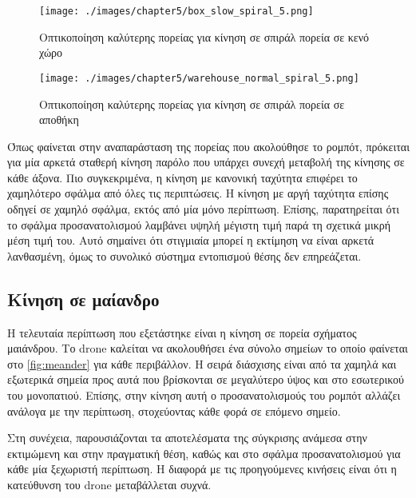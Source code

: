 \begin{figure}[!ht]
    \centering
    \texttt{[image: ./images/chapter5/box\_slow\_spiral\_5.png]}
    \caption{Οπτικοποίηση καλύτερης πορείας για κίνηση σε σπιράλ πορεία σε κενό χώρο}
    \label{fig:path_spiral_slow_corridor}
\end{figure}

\begin{figure}[!ht]
    \centering
    \texttt{[image: ./images/chapter5/warehouse\_normal\_spiral\_5.png]}
    \caption{Οπτικοποίηση καλύτερης πορείας για κίνηση σε σπιράλ πορεία σε αποθήκη}
    \label{fig:path_spiral_normal_warehouse}
\end{figure}

Όπως φαίνεται στην αναπαράσταση της πορείας που ακολούθησε το ρομπότ, πρόκειται για μία αρκετά σταθερή κίνηση παρόλο που υπάρχει συνεχή μεταβολή της κίνησης σε κάθε άξονα. Πιο συγκεκριμένα, η κίνηση με κανονική ταχύτητα επιφέρει το χαμηλότερο σφάλμα από όλες τις περιπτώσεις. Η κίνηση με αργή ταχύτητα επίσης οδηγεί σε χαμηλό σφάλμα, εκτός από μία μόνο περίπτωση. Επίσης, παρατηρείται ότι το σφάλμα προσανατολισμού λαμβάνει υψηλή μέγιστη τιμή παρά τη σχετικά μικρή μέση τιμή του. Αυτό σημαίνει ότι στιγμιαία μπορεί η εκτίμηση να είναι αρκετά λανθασμένη, όμως το συνολικό σύστημα εντοπισμού θέσης δεν επηρεάζεται.

\clearpage

\subsection{Κίνηση σε μαίανδρο}
\label{subsection:localization_tests_meander}

Η τελευταία περίπτωση που εξετάστηκε είναι η κίνηση σε πορεία σχήματος μαιάνδρου. Το drone καλείται να ακολουθήσει ένα σύνολο σημείων το οποίο φαίνεται στο \autoref{fig:meander} για κάθε περιβάλλον. Η σειρά διάσχισης είναι από τα χαμηλά και εξωτερικά σημεία προς αυτά που βρίσκονται σε μεγαλύτερο ύψος και στο εσωτερικού του μονοπατιού. Επίσης, στην κίνηση αυτή ο προσανατολισμούς του ρομπότ αλλάζει ανάλογα με την περίπτωση, στοχεύοντας κάθε φορά σε επόμενο σημείο.

Στη συνέχεια, παρουσιάζονται τα αποτελέσματα της σύγκρισης ανάμεσα στην εκτιμώμενη και στην πραγματική θέση, καθώς και στο σφάλμα προσανατολισμού για κάθε μία ξεχωριστή περίπτωση. Η διαφορά με τις προηγούμενες κινήσεις είναι ότι η κατεύθυνση του drone μεταβάλλεται συχνά.

